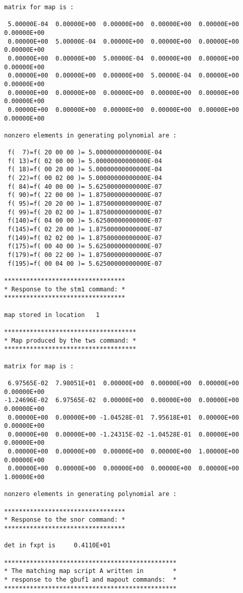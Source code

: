 \begin{footnotesize}
\begin{verbatim}
matrix for map is :

 5.00000E-04  0.00000E+00  0.00000E+00  0.00000E+00  0.00000E+00  0.00000E+00
 0.00000E+00  5.00000E-04  0.00000E+00  0.00000E+00  0.00000E+00  0.00000E+00
 0.00000E+00  0.00000E+00  5.00000E-04  0.00000E+00  0.00000E+00  0.00000E+00
 0.00000E+00  0.00000E+00  0.00000E+00  5.00000E-04  0.00000E+00  0.00000E+00
 0.00000E+00  0.00000E+00  0.00000E+00  0.00000E+00  0.00000E+00  0.00000E+00
 0.00000E+00  0.00000E+00  0.00000E+00  0.00000E+00  0.00000E+00  0.00000E+00

nonzero elements in generating polynomial are :

 f(  7)=f( 20 00 00 )= 5.00000000000000E-04
 f( 13)=f( 02 00 00 )= 5.00000000000000E-04
 f( 18)=f( 00 20 00 )= 5.00000000000000E-04
 f( 22)=f( 00 02 00 )= 5.00000000000000E-04
 f( 84)=f( 40 00 00 )= 5.62500000000000E-07
 f( 90)=f( 22 00 00 )= 1.87500000000000E-07
 f( 95)=f( 20 20 00 )= 1.87500000000000E-07
 f( 99)=f( 20 02 00 )= 1.87500000000000E-07
 f(140)=f( 04 00 00 )= 5.62500000000000E-07
 f(145)=f( 02 20 00 )= 1.87500000000000E-07
 f(149)=f( 02 02 00 )= 1.87500000000000E-07
 f(175)=f( 00 40 00 )= 5.62500000000000E-07
 f(179)=f( 00 22 00 )= 1.87500000000000E-07
 f(195)=f( 00 04 00 )= 5.62500000000000E-07

*********************************
* Response to the stm1 command: *
*********************************

map stored in location   1

************************************
* Map produced by the tws command: *
************************************

matrix for map is :

 6.97565E-02  7.98051E+01  0.00000E+00  0.00000E+00  0.00000E+00  0.00000E+00
-1.24696E-02  6.97565E-02  0.00000E+00  0.00000E+00  0.00000E+00  0.00000E+00
 0.00000E+00  0.00000E+00 -1.04528E-01  7.95618E+01  0.00000E+00  0.00000E+00
 0.00000E+00  0.00000E+00 -1.24315E-02 -1.04528E-01  0.00000E+00  0.00000E+00
 0.00000E+00  0.00000E+00  0.00000E+00  0.00000E+00  1.00000E+00  0.00000E+00
 0.00000E+00  0.00000E+00  0.00000E+00  0.00000E+00  0.00000E+00  1.00000E+00

nonzero elements in generating polynomial are :

*********************************
* Response to the snor command: *
*********************************

det in fxpt is     0.4110E+01

***********************************************
* The matching map script A written in        *
* response to the gbuf1 and mapout commands:  *
***********************************************


\end{verbatim}
\end{footnotesize}
